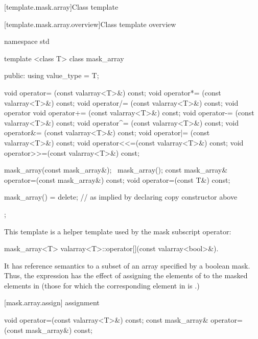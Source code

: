 [template.mask.array]{Class template }

[template.mask.array.overview]{Class template  overview}

%
\begin{codeblock}
namespace std {
  template <class T> class mask_array {
  public:
    using value_type = T;

    void operator=  (const valarray<T>&) const;
    void operator*= (const valarray<T>&) const;
    void operator/= (const valarray<T>&) const;
    void operator%
    void operator+= (const valarray<T>&) const;
    void operator-= (const valarray<T>&) const;
    void operator^= (const valarray<T>&) const;
    void operator&= (const valarray<T>&) const;
    void operator|= (const valarray<T>&) const;
    void operator<<=(const valarray<T>&) const;
    void operator>>=(const valarray<T>&) const;

    mask_array(const mask_array&);
   ~mask_array();
    const mask_array& operator=(const mask_array&) const;
    void operator=(const T&) const;

    mask_array() = delete;        // as implied by declaring copy constructor above
  };
}
\end{codeblock}

\pnum
This template is a helper template used by the mask subscript operator:

%
%
\begin{itemdecl}
mask_array<T> valarray<T>::operator[](const valarray<bool>&).
\end{itemdecl}

\begin{itemdescr}
\pnum
It has reference semantics to a subset of an array specified by a boolean mask.
Thus, the expression
has the effect of assigning the elements of
to the masked
elements in
(those for which the corresponding element
in
is
.)
\end{itemdescr}

[mask.array.assign]{ assignment}

%
\begin{itemdecl}
void operator=(const valarray<T>&) const;
const mask_array& operator=(const mask_array&) const;
\end{itemdecl}

